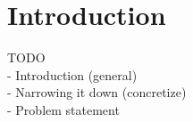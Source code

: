 \chapter{Introduction}
TODO \\
- Introduction (general) \\
- Narrowing it down (concretize) \\
- Problem statement \\